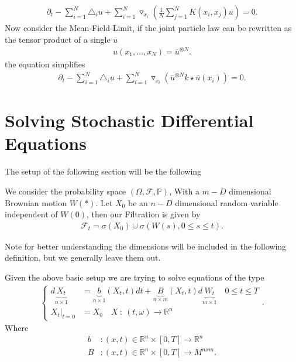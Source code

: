 \begin{align*}
  \partial_t - \sum_{i=1}^{N} \triangle_i u  + \sum_{i=1}^{N} \triangledown_{x_i} \left( \frac{1}{N} \sum_{j=1}^{N} K(x_i,x_j) u \right)  = 0
.\end{align*}
Now consider the Mean-Field-Limit, if the joint particle law can be rewritten as the tensor product of a single $\overline{u}$ 
\begin{align*}
 u(x_{1},\ldots ,x_N)  = \overline{u}^{\otimes N}  
.\end{align*}
the equation simplifies
\begin{align*}
  \partial_t - \sum_{i=1}^{N} \triangle_i u  + \sum_{i=1}^{N} \triangledown_{x_i} \left( \overline{u}^{\otimes N}k \star \overline{u}(x_i)   \right)  = 0
.\end{align*}
\section{Solving Stochastic Differential Equations}
The setup of the following section will be the following 
\begin{definition}
 We consider the probability space $(\Omega ,\mathcal{F},\mathbb{P})$, With a $m-D$ dimensional Brownian motion $W(*)$. Let $X_0$ be an 
 $n-D$ dimensional random variable independent of $W(0)$, then our Filtration is given by
 \begin{align*}
  \mathcal{F}_t = \sigma(X_{0}) \cup \sigma(W(s) , 0\le s\le t)
 .\end{align*}
\end{definition}
Note for better understanding the dimensions will be included in the following definition, but we generally leave them out.
\begin{definition}[SDE]
 Given the above basic setup we are trying to solve equations of the type 
 \begin{align*}
  \begin{cases}
    d\underbrace{X_t}_{n \times 1} &= \underbrace{b}_{n \times 1}(X_t,t) dt + \underbrace{B}_{n \times m}(X_t,t) d\underbrace{W_t}_{m \times 1} \quad 0\le t\le T \\
    X_{t}\rvert_{t=0} &= X_{0} \quad X \ : \ (t,\omega ) \to  \mathbb{R}^{n} 
  \end{cases}
 .\end{align*}
 Where 
 \begin{align*}
   b &: (x,t) \in  \mathbb{R}^{n} \times [0,T] \to \mathbb{R}^{n}   \\
   B &: (x,t) \in  \mathbb{R}^{n} \times [0,T] \to  M^{nxm}  
 .\end{align*}
\end{definition}
